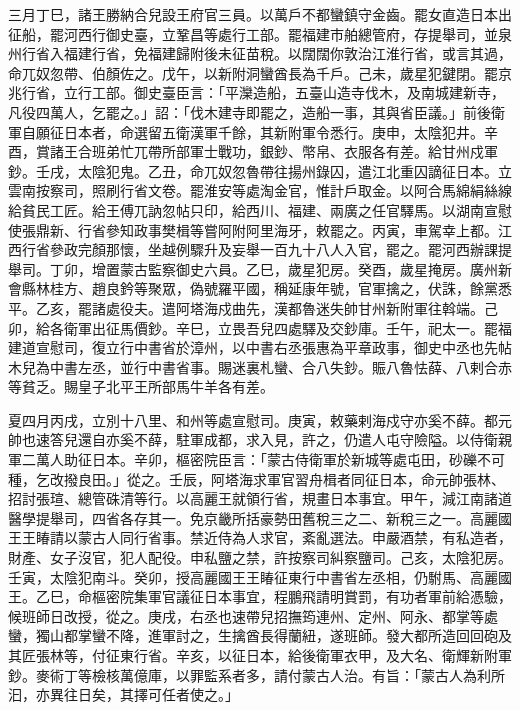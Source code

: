 \begin{pinyinscope}
 三月丁巳，諸王勝納合兒設王府官三員。以萬戶不都蠻鎮守金齒。罷女直造日本出征船，罷河西行御史臺，立鞏昌等處行工部。罷福建市舶總管府，存提舉司，並泉州行省入福建行省，免福建歸附後未征苗稅。以闊闊你敦治江淮行省，或言其過，命兀奴忽帶、伯顏佐之。戊午，以新附洞蠻酋長為千戶。己未，歲星犯鍵閉。罷京兆行省，立行工部。御史臺臣言：「平灤造船，五臺山造寺伐木，及南城建新寺，凡役四萬人，乞罷之。」詔：「伐木建寺即罷之，造船一事，其與省臣議。」前後衛軍自願征日本者，命選留五衛漢軍千餘，其新附軍令悉行。庚申，太陰犯井。辛酉，賞諸王合班弟忙兀帶所部軍士戰功，銀鈔、幣帛、衣服各有差。給甘州戍軍鈔。壬戌，太陰犯鬼。乙丑，命兀奴忽魯帶往揚州錄囚，遣江北重囚謫征日本。立雲南按察司，照刷行省文卷。罷淮安等處淘金官，惟計戶取金。以阿合馬綿絹絲線給貧民工匠。給王傅兀訥忽帖只印，給西川、福建、兩廣之任官驛馬。以湖南宣慰使張鼎新、行省參知政事樊楫等嘗阿附阿里海牙，敕罷之。丙寅，車駕幸上都。江西行省參政完顏那懷，坐越例驟升及妄舉一百九十八人入官，罷之。罷河西辦課提舉司。丁卯，增置蒙古監察御史六員。乙巳，歲星犯房。癸酉，歲星掩房。廣州新會縣林桂方、趙良鈐等聚眾，偽號羅平國，稱延康年號，官軍擒之，伏誅，餘黨悉平。乙亥，罷諸處役夫。遣阿塔海戍曲先，漢都魯迷失帥甘州新附軍往斡端。己卯，給各衛軍出征馬價鈔。辛巳，立畏吾兒四處驛及交鈔庫。壬午，祀太一。罷福建道宣慰司，復立行中書省於漳州，以中書右丞張惠為平章政事，御史中丞也先帖木兒為中書左丞，並行中書省事。賜迷裏札蠻、合八失鈔。賑八魯怯薛、八剌合赤等貧乏。賜皇子北平王所部馬牛羊各有差。



 夏四月丙戌，立別十八里、和州等處宣慰司。庚寅，敕藥剌海戍守亦奚不薛。都元帥也速答兒還自亦奚不薛，駐軍成都，求入見，許之，仍遣人屯守險隘。以侍衛親軍二萬人助征日本。辛卯，樞密院臣言：「蒙古侍衛軍於新城等處屯田，砂礫不可種，乞改撥良田。」從之。壬辰，阿塔海求軍官習舟楫者同征日本，命元帥張林、招討張瑄、總管硃清等行。以高麗王就領行省，規畫日本事宜。甲午，減江南諸道醫學提舉司，四省各存其一。免京畿所括豪勢田舊稅三之二、新稅三之一。高麗國王王睶請以蒙古人同行省事。禁近侍為人求官，紊亂選法。申嚴酒禁，有私造者，財產、女子沒官，犯人配役。申私鹽之禁，許按察司糾察鹽司。己亥，太陰犯房。壬寅，太陰犯南斗。癸卯，授高麗國王王睶征東行中書省左丞相，仍駙馬、高麗國王。乙巳，命樞密院集軍官議征日本事宜，程鵬飛請明賞罰，有功者軍前給憑驗，候班師日改授，從之。庚戌，右丞也速帶兒招撫筠連州、定州、阿永、都掌等處蠻，獨山都掌蠻不降，進軍討之，生擒酋長得蘭紐，遂班師。發大都所造回回砲及其匠張林等，付征東行省。辛亥，以征日本，給後衛軍衣甲，及大名、衛輝新附軍鈔。麥術丁等檢核萬億庫，以罪監系者多，請付蒙古人治。有旨：「蒙古人為利所汩，亦異往日矣，其擇可任者使之。」




\end{pinyinscope}

